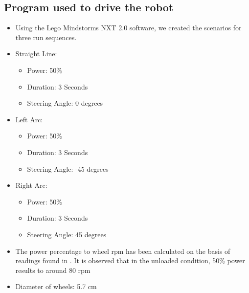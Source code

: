 \documentclass[10pt,a4paper]{article}
\begin{document}
	\subsection{Program used to drive the robot}
		\begin{itemize}
			\item Using the Lego Mindstorms NXT 2.0 software, we created the scenarios for three run sequences.
			\item Straight Line:
				\begin{itemize}
					\item Power: 50\%
					\item Duration: 3 Seconds
					\item Steering Angle: 0 degrees
				\end{itemize}
			\item Left Arc:
				\begin{itemize}
					\item Power: 50\%
					\item Duration: 3 Seconds
					\item Steering Angle: -45 degrees
				\end{itemize}
			\item Right Arc:
				\begin{itemize}
					\item Power: 50\%
					\item Duration: 3 Seconds
					\item Steering Angle: 45 degrees
				\end{itemize}		
			\item The power percentage to wheel rpm has been calculated on the basis of readings found in \cite{motorInternals}. It is observed that in the unloaded condition, 50\% power results to around 80 rpm
			\item Diameter of wheels: 5.7 cm
		\end{itemize}
\end{document}
